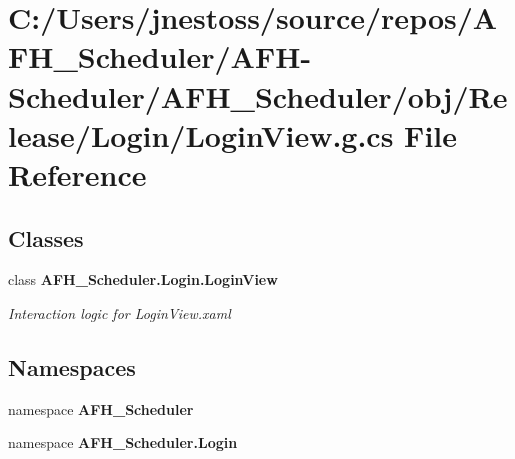 \section{C\+:/\+Users/jnestoss/source/repos/\+A\+F\+H\+\_\+\+Scheduler/\+A\+F\+H-\/\+Scheduler/\+A\+F\+H\+\_\+\+Scheduler/obj/\+Release/\+Login/\+Login\+View.g.\+cs File Reference}
\label{_release_2_login_2_login_view_8g_8cs}
\subsection*{Classes}
\begin{DoxyCompactItemize}
\item 
class \textbf{ A\+F\+H\+\_\+\+Scheduler.\+Login.\+Login\+View}
\begin{DoxyCompactList}\small\item\em Interaction logic for Login\+View.\+xaml \end{DoxyCompactList}\end{DoxyCompactItemize}
\subsection*{Namespaces}
\begin{DoxyCompactItemize}
\item 
namespace \textbf{ A\+F\+H\+\_\+\+Scheduler}
\item 
namespace \textbf{ A\+F\+H\+\_\+\+Scheduler.\+Login}
\end{DoxyCompactItemize}
